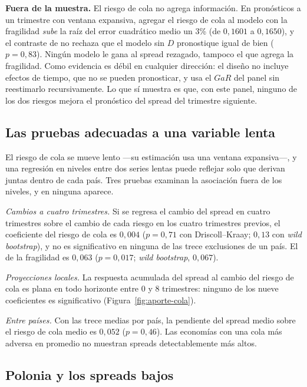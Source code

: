 \textbf{Fuera de la muestra.} El riesgo de cola no agrega información. En pronósticos a un trimestre con ventana expansiva, agregar el riesgo de cola al modelo con la fragilidad \emph{sube} la raíz del error cuadrático medio un 3\% (de $0{,}1601$ a $0{,}1650$), y el contraste de \citet{ClarkWest2007} no rechaza que el modelo sin $D$ pronostique igual de bien ($p=0{,}83$). Ningún modelo le gana al spread rezagado, tampoco el que agrega la fragilidad. Como evidencia es débil en cualquier dirección: el diseño no incluye efectos de tiempo, que no se pueden pronosticar, y usa el $GaR$ del panel sin reestimarlo recursivamente. Lo que sí muestra es que, con este panel, ninguno de los dos riesgos mejora el pronóstico del spread del trimestre siguiente.

\subsection{Las pruebas adecuadas a una variable lenta}

El riesgo de cola se mueve lento ---su estimación usa una ventana expansiva---, y una regresión en niveles entre dos series lentas puede reflejar solo que derivan juntas dentro de cada país. Tres pruebas examinan la asociación fuera de los niveles, y en ninguna aparece.


\emph{Cambios a cuatro trimestres.} Si se regresa el cambio del spread en cuatro trimestres sobre el cambio de cada riesgo en los cuatro trimestres previos, el coeficiente del riesgo de cola es $0{,}004$ ($p=0{,}71$ con Driscoll--Kraay; $0{,}13$ con \textit{wild bootstrap}), y no es significativo en ninguna de las trece exclusiones de un país. El de la fragilidad es $0{,}063$ ($p=0{,}017$; \textit{wild bootstrap}, $0{,}067$).

\emph{Proyecciones locales.} La respuesta acumulada del spread al cambio del riesgo de cola es plana en todo horizonte entre 0 y 8 trimestres: ninguno de los nueve coeficientes es significativo (Figura~\ref{fig:aporte-cola}).

\emph{Entre países.} Con las trece medias por país, la pendiente del spread medio sobre el riesgo de cola medio es $0{,}052$ ($p=0{,}46$). Las economías con una cola más adversa en promedio no muestran spreads detectablemente más altos.

\subsection{Polonia y los spreads bajos}

